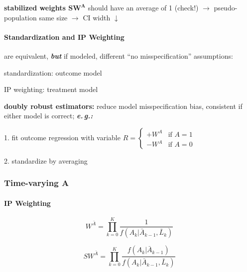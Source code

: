 \documentclass[8pt]{extarticle}
\begin{document}
\begin{multicols}{2}
\noindent \textbf{stabilized weights $\boldsymbol{SW^A}$} should have an average of 1 (check!) $\rightarrow$ pseudo-population same size $\rightarrow$ CI width $\downarrow$

\paragraph{\large Standardization and IP Weighting}

are equivalent, \textit{\textbf{but}} if modeled, different ``no misspecification'' assumptions:

standardization: outcome model

IP weighting: treatment model

\noindent \textbf{doubly robust estimators:} reduce model misspecification bias, consistent if either model is correct; \textbf{\textit{e.\,g.:}} \vspace{-0.9em}

1. fit outcome regression with variable $R = \begin{cases} +W^A & \text{if } A{=}1 \\ -W^A & \text{if } A{=}0 \end{cases}$ \vspace{-0.9em}

2. standardize by averaging



\subsubsection{Time-varying A}







\paragraph{\large IP Weighting} 

$$ W^{\bar{A}} = \prod_{k=0}^K \frac{1}{f\left(A_k|\bar{A}_{k-1}, \bar{L}_k\right)}$$


$$ SW^{\bar{A}} = \prod_{k=0}^K \frac{f\left(A_k|\bar{A}_{k-1}\right)}{f\left(A_k|\bar{A}_{k-1}, \bar{L}_k\right)}$$


\end{multicols}
\end{document}
